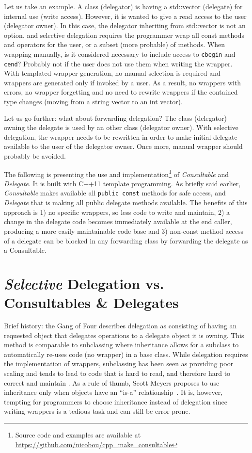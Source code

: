 \documentclass{article}
\begin{document}
Let us take an example. A class (delegator) is having a std::vector (delegate) for internal use (write access). However, it is wanted to give a read access to the user (delegator owner). In this case, the delegator inheriting from std::vector is not an option, and selective delegation requires the programmer wrap all const methods and operators for the user, or a subset (more probable) of methods. When wrapping manually, is it considered necessary to include access to \verb+cbegin+ and \verb+cend+? Probably not if the user does not use them when writing the wrapper. With templated wrapper generation, no manual selection is required and wrappers are generated only if invoked by a user. As a result, no wrappers with errors, no wrapper forgetting and no need to rewrite wrappers if the contained type changes (moving from a string vector to an int vector).  

Let us go further: what about forwarding delegation? The class (delegator) owning the delegate is used by an other class (delegator owner). With selective delegation, the wrapper needs to be rewritten in order to make initial delegate available to the user of the delegator owner. Once more, manual wrapper should probably be avoided. 

The following is presenting the use and implementation\footnote{Source code and examples are available at \url{https://github.com/nicobou/cpp_make_consultable}} of \textit{Consultable} and \textit{Delegate}. It is built with C++11 template programming. As briefly said earlier, \textit{Consultable} makes available all \verb+public const+ methods for safe access, and \textit{Delegate} that is making all public delegate methods available. The benefits of this approach is 1) no specific wrappers, so less code to write and maintain, 2) a change in the delegate code becomes immediately available at the end caller, producing a more easily maintainable code base and 3) non-const method access of a delegate can be blocked in any forwarding class by forwarding the delegate as a Consultable. 

\section{\textit{Selective} Delegation vs. Consultables \& Delegates}
Brief history: the Gang of Four\cite{1995gamma} describes delegation as consisting of having an requested object that delegates operations to a delegate object it is owning. This method is comparable to subclassing where inheritance allows for a subclass to automatically re-uses code (no wrapper) in a base class.  While delegation requires the implementation of wrappers, subclassing has been seen as providing poor scaling and tends to lead to code that is hard to read, and therefore hard to correct and maintain \cite{2007cser}. As a rule of thumb, Scott Meyers proposes to use inheritance only when objects have an ``is-a'' relationship~\cite{2005Meyers}. It is, however, tempting for programmers to choose inheritance instead of delegation since writing wrappers is a tedious task and can still be error prone.
\end{document}
